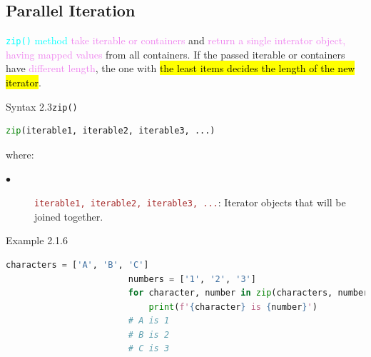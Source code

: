 \documentclass{book}
\begin{document}
    \subsection{Parallel Iteration}
    \textcolor{cyan}{\texttt{zip()} method} \textcolor{violet}{take iterable or containers} and \textcolor{violet}{return a single interator object, having mapped values} from all containers.
    If the passed iterable or containers have \textcolor{violet}{different length}, the one with \hl{the least items decides the length of the new iterator}.
    \begin{synBox}{Syntax 2.3}{\texttt{zip()}}
        \begin{lstlisting}[language=Python, basicstyle=\ttfamily\small, keywordstyle=\color{blue}, commentstyle=\color{forestgreen}, stringstyle=\color{red}, showstringspaces=false]
                            zip(iterable1, iterable2, iterable3, ...)
        \end{lstlisting}
        \raggedright
        where: \\
        \begin{description}
            \item[$\bullet$] \textcolor{brown}{\texttt{iterable1, iterable2, iterable3, ...}}: Iterator objects that will be joined together.
        \end{description}
    \end{synBox}
    \begin{egBox}[]{Example 2.1.6}{}
    \begin{lstlisting}[language=Python, basicstyle=\ttfamily\small, keywordstyle=\color{blue}, commentstyle=\color{forestgreen}, stringstyle=\color{red}, showstringspaces=false]
                        characters = ['A', 'B', 'C']
                        numbers = ['1', '2', '3']
                        for character, number in zip(characters, numbers):
                            print(f'{character} is {number}')
                        # A is 1
                        # B is 2
                        # C is 3
    \end{lstlisting}
    \end{egBox}
\end{document}
